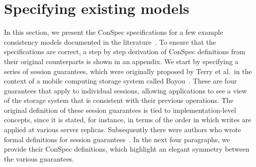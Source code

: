 \documentclass[journal,compsoc]{IEEEtran}
\begin{document}
  
 \section{Specifying existing models}\label{sec:list}
In this section, we present the ConSpec specifications for a few example %
 consistency models  documented in the literature~\cite{Chockler2000, Terry:1994:SGW:645792.668302, Burckhardt:2014:PEC:2693641.2693642}. To ensure that the specifications are correct, a step by step derivation of  ConSpec definitions from their original counterparts is shown in an appendix. %
We start by specifying a series of session guarantees, which were originally proposed by Terry et al.\ in the context of a mobile computing storage system called Bayou~\cite{Terry:1994:SGW:645792.668302}. These are four guarantees that apply to individual sessions, allowing applications to see a view of the storage system that is consistent with their previous operations. The original definition of these session guarantees is tied to implementation-level concepts, since it is stated, for instance, in terms of the order in which writes are applied at various server replicas. Subsequently there were authors who wrote formal definitions for session guarantees~\cite{Chockler2000, Burckhardt:2014:PEC:2693641.2693642}. In the next four paragraphs, we provide their ConSpec definitions, which highlight an elegant symmetry between the various guarantees.
\end{document}
